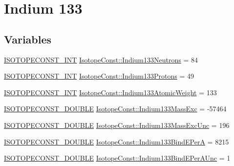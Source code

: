 \hypertarget{group___isotope_const-_indium-_in133}{}\section{Indium 133}
\label{group___isotope_const-_indium-_in133}
\subsection*{Variables}
\begin{DoxyCompactItemize}
\item 
\mbox{\hyperlink{group___isotope_const-_macros_ga5f18360b3e99483a35c32d789e62621c}{I\+S\+O\+T\+O\+P\+E\+C\+O\+N\+S\+T\+\_\+\+I\+NT}} \mbox{\hyperlink{group___isotope_const-_indium-_in133_ga2d4531c74689f62eb3b1f7914b56fffa}{Isotope\+Const\+::\+Indium133\+Neutrons}} = 84
\item 
\mbox{\hyperlink{group___isotope_const-_macros_ga5f18360b3e99483a35c32d789e62621c}{I\+S\+O\+T\+O\+P\+E\+C\+O\+N\+S\+T\+\_\+\+I\+NT}} \mbox{\hyperlink{group___isotope_const-_indium-_in133_gabd902452b5518c9dfaee0075aec51df9}{Isotope\+Const\+::\+Indium133\+Protons}} = 49
\item 
\mbox{\hyperlink{group___isotope_const-_macros_ga5f18360b3e99483a35c32d789e62621c}{I\+S\+O\+T\+O\+P\+E\+C\+O\+N\+S\+T\+\_\+\+I\+NT}} \mbox{\hyperlink{group___isotope_const-_indium-_in133_ga2a7205fd1804bb27f2871c3a2e7b786c}{Isotope\+Const\+::\+Indium133\+Atomic\+Weight}} = 133
\item 
\mbox{\hyperlink{group___isotope_const-_macros_ga8f45a7272ce02c0b4c65c44636ed719a}{I\+S\+O\+T\+O\+P\+E\+C\+O\+N\+S\+T\+\_\+\+D\+O\+U\+B\+LE}} \mbox{\hyperlink{group___isotope_const-_indium-_in133_ga33be811d44b0020608ce585aed8cd774}{Isotope\+Const\+::\+Indium133\+Mass\+Exc}} = -\/57464
\item 
\mbox{\hyperlink{group___isotope_const-_macros_ga8f45a7272ce02c0b4c65c44636ed719a}{I\+S\+O\+T\+O\+P\+E\+C\+O\+N\+S\+T\+\_\+\+D\+O\+U\+B\+LE}} \mbox{\hyperlink{group___isotope_const-_indium-_in133_gaca7c8255544f14d36be2b13a2c8c8267}{Isotope\+Const\+::\+Indium133\+Mass\+Exc\+Unc}} = 196
\item 
\mbox{\hyperlink{group___isotope_const-_macros_ga8f45a7272ce02c0b4c65c44636ed719a}{I\+S\+O\+T\+O\+P\+E\+C\+O\+N\+S\+T\+\_\+\+D\+O\+U\+B\+LE}} \mbox{\hyperlink{group___isotope_const-_indium-_in133_ga80eb10dd91c7c9d144cd6440b5c0d592}{Isotope\+Const\+::\+Indium133\+Bind\+E\+PerA}} = 8215
\item 
\mbox{\hyperlink{group___isotope_const-_macros_ga8f45a7272ce02c0b4c65c44636ed719a}{I\+S\+O\+T\+O\+P\+E\+C\+O\+N\+S\+T\+\_\+\+D\+O\+U\+B\+LE}} \mbox{\hyperlink{group___isotope_const-_indium-_in133_ga5f1d9b6e777b4fd7cfb79162f53685bc}{Isotope\+Const\+::\+Indium133\+Bind\+E\+Per\+A\+Unc}} = 1

\end{DoxyCompactItemize}
